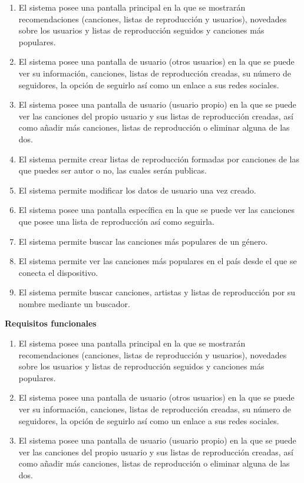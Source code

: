 \documentclass[12pt]{article}%
\begin{document}
\begin{enumerate}
	\item  El sistema posee una pantalla principal en la que se mostrar\'an recomendaciones (canciones, listas de reproducci\'on y usuarios), novedades sobre los usuarios y listas de reproducci\'on seguidos y canciones m\'as populares. 
	\item  El sistema posee una pantalla de usuario (otros usuarios) en la que se puede ver su informaci\'on, canciones, listas de reproducci\'on creadas, su n\'umero de seguidores, la opci\'on de seguirlo as\'i como un enlace a sus redes sociales.
	\item  El sistema posee una pantalla de usuario (usuario propio) en la que se puede ver las canciones del propio usuario y sus listas de reproducci\'on creadas, as\'i como añadir m\'as canciones, listas de reproducci\'on o eliminar alguna de las dos.
	
	\item  El sistema permite crear listas de reproducci\'on formadas por canciones de las que puedes ser autor o no, las cuales ser\'an publicas.
	\item  El sistema permite modificar los datos de usuario una vez creado.
	\item  El sistema posee una pantalla espec\'ifica en la que se puede ver las canciones que posee una lista de reproducci\'on as\'i como seguirla.
	\item  El sistema permite buscar las canciones m\'as populares de un g\'enero.
	\item  El sistema permite ver las canciones m\'as populares en el pa\'is desde el que se conecta el dispositivo.
	\item  El sistema permite buscar canciones, artistas y listas de reproducci\'on por su nombre mediante un buscador.
\end{enumerate}

\textbf{Requisitos funcionales}
\begin{enumerate}
	\item El sistema posee una pantalla principal en la que se mostrar\'an recomendaciones (canciones, listas de reproducci\'on y usuarios), novedades sobre los usuarios y listas de reproducci\'on seguidos y canciones m\'as populares. 
	\item El sistema posee una pantalla de usuario (otros usuarios) en la que se puede ver su informaci\'on, canciones, listas de reproducci\'on creadas, su n\'umero de seguidores, la opci\'on de seguirlo as\'i como un enlace a sus redes sociales.
	\item El sistema posee una pantalla de usuario (usuario propio) en la que se puede ver las canciones del propio usuario y sus listas de reproducci\'on creadas, as\'i como añadir m\'as canciones, listas de reproducci\'on o eliminar alguna de las dos.
\end{enumerate}
\end{document}
